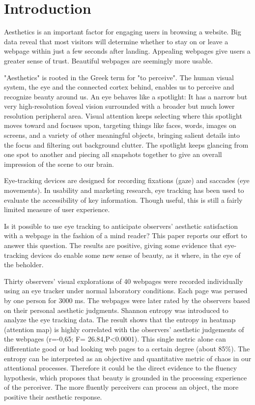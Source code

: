 
\section{Introduction}
\label{sec:intro}
Aesthetics is an important factor for engaging users in browsing a website.
Big data reveal that most visitors will determine whether to stay on or leave a webpage within just a few seconds after landing\cite{Liu2010}.
Appealing webpages give users a greater sense of trust\cite{Everard2005}\cite{Lindgaard2011}.
Beautiful webpages are seemingly more usable\cite{Tractinsky2000}.

"Aesthetics" is rooted in the Greek term for "to perceive".
The human visual system, the eye and the connected cortex behind, enables us to perceive and recognize beauty around us.
An eye behaves like a spotlight\cite{Eriksen1972}: It has a narrow but very high-resolution foveal vision surrounded with a broader but much lower resolution peripheral area.
Visual attention keeps selecting where this spotlight moves toward and focuses upon, targeting things like faces, words, images on screens, and a variety of other meaningful objects, bringing salient details into the focus and filtering out background clutter.
The spotlight keeps glancing from one spot to another and piecing all snapshots together to give an overall impression of the scene to our brain.

Eye-tracking devices are designed for recording fixations (gaze) and saccades (eye movements).
In usability and marketing research, eye tracking has been used to evaluate the accessibility of key information.
Though useful, this is still a fairly limited measure of user experience\cite{Santella}.

Is it possible to use eye tracking to anticipate observers' aesthetic satisfaction with a webpage in the fashion of a mind reader?
This paper reports our effort to answer this question.
The results are positive, giving some evidence that eye-tracking devices do enable some new sense of beauty, as it where, in the eye of the beholder.

Thirty observers' visual explorations of 40 webpages were recorded individually using an eye tracker under normal laboratory conditions. Each page was perused by one person for 3000 ms.
The webpages were later rated by the observers based on their personal aesthetic judgments.
Shannon entropy was introduced to analyze the eye tracking data.
The result shows that the entropy in heatmap (attention map) is highly correlated with the observers' aesthetic judgements of the webpages (r=-0,65; F= 26.84,P<0.0001).
This single metric alone can differentiate good or bad looking web pages to a certain degree (about 85\%).
The entropy can be interpreted as an objective and quantitative metric of chaos in our attentional processes.
Therefore it could be the direct evidence to the fluency hypothesis\cite{Reber2004}, which proposes that beauty is grounded in the processing experience of the perceiver.
The more fluently perceivers can process an object, the more positive their aesthetic response.

